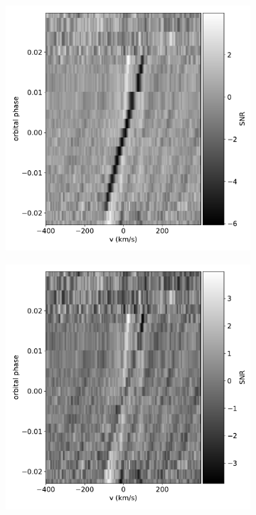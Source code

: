 \documentclass[twocolumn]{aastex631}
\begin{document}
            \begin{figure}[ht!]\label{fig:raw-CCFs}
                \begin{subfigure}[b]{0.333\textwidth}\label{fig:raw-ccf-before-Fe-blue}
                    \includegraphics[width=\textwidth]{plots/raw-ccf-before/KELT-20b.20190504.Fe.blue.CCFs-raw.pdf}
                \end{subfigure}

                \begin{subfigure}[b]{0.333\textwidth}\label{fig:raw-ccf-after-Fe-blue}
                    \includegraphics[width=\textwidth]{plots/raw-ccf-after/KELT-20b.20190504.Fe.blue.CCFs-raw.pdf}
                \end{subfigure}
            

\end{figure}
\end{document}

